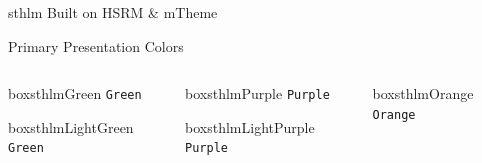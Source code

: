 \documentclass[newPxFont]{beamer}
\begin{document}
\begin{frame}[c]{sthlm Built on HSRM \& mTheme}
\begin{frame}[c]{Primary Presentation Colors}
\begin{columns}[c]
\begin{column}{0.12\textwidth}

\vspace{3em}

\begin{beamercolorbox}[wd=\linewidth,ht=5ex,dp=3ex]{boxsthlmGreen}
\centering
	\texttt{Green}
\end{beamercolorbox}

\vspace{3em}

\begin{beamercolorbox}[wd=\linewidth,ht=5ex,dp=3ex]{boxsthlmLightGreen}
\centering
	\texttt{Green}
\end{beamercolorbox}
\end{column}

\begin{column}{0.12\textwidth}

\vspace{3em}

\begin{beamercolorbox}[wd=\linewidth,ht=5ex,dp=3ex]{boxsthlmPurple}
\centering
	\texttt{Purple}
\end{beamercolorbox}

\vspace{3em}

\begin{beamercolorbox}[wd=\linewidth,ht=5ex,dp=3ex]{boxsthlmLightPurple}
\centering
	\texttt{Purple}
\end{beamercolorbox}
\end{column}

\begin{column}{0.12\textwidth}

\vspace{3em}

\begin{beamercolorbox}[wd=\linewidth,ht=5ex,dp=3ex]{boxsthlmOrange}
\centering
	\texttt{Orange}
\end{beamercolorbox}

\vspace{3em}


\end{column}
\end{columns}
\end{frame}
\end{frame}
\end{document}
